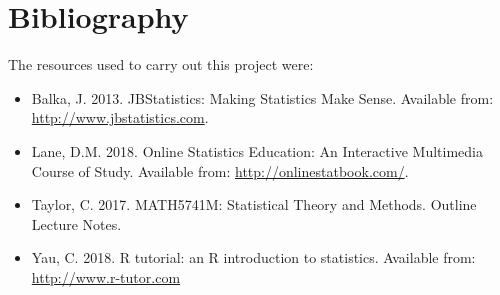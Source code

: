 \documentclass[]{article}
\providecommand{\tightlist}{%
  \setlength{\itemsep}{0pt}\setlength{\parskip}{0pt}}
\begin{document}
\section{Bibliography}\label{bibliography}

The resources used to carry out this project were:

\begin{itemize}
\tightlist
\item
  Balka, J. 2013. JBStatistics: Making Statistics Make Sense. Available
  from: \url{http://www.jbstatistics.com}.
\item
  Lane, D.M. 2018. Online Statistics Education: An Interactive
  Multimedia Course of Study. Available from:
  \url{http://onlinestatbook.com/}.
\item
  Taylor, C. 2017. MATH5741M: Statistical Theory and Methods. Outline
  Lecture Notes.
\item
  Yau, C. 2018. R tutorial: an R introduction to statistics. Available
  from: \url{http://www.r-tutor.com}
\end{itemize}
\end{document}
